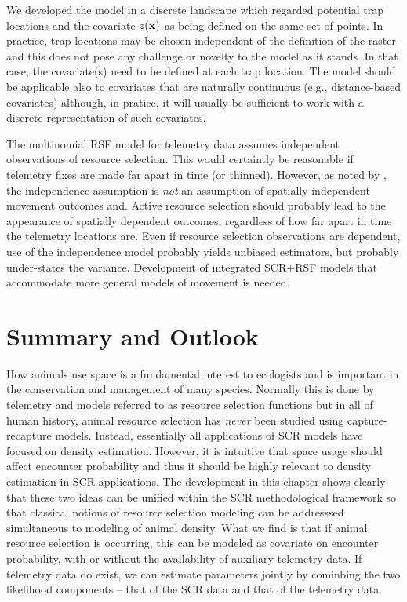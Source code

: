 We developed the model in a discrete landscape which regarded
potential trap
locations and the covariate $z({\bf x})$ as being defined on the same
set of points. In practice, trap locations may be chosen
independent of the definition of the raster and this does not pose any
challenge or novelty to the model as it stands. In that
case, the covariate(s) need to be defined at each trap location.
The model should be applicable also to covariates that are naturally
continuous (e.g., distance-based covariates) although, in pratice, it
will usually be sufficient to work with a discrete representation of
such covariates.

The multinomial RSF model for telemetry data assumes
independent observations of resource selection.  This would certaintly
be reasonable if telemetry fixes are made far apart in time (or thinned).
However, as noted by \citet{royle_etal:2012mee}, the independence assumption
is {\it not} an assumption of spatially independent movement outcomes
and.   %
Active resource selection should probably lead to the appearance of
spatially dependent outcomes,
 regardless of how far apart in time the telemetry
locations are.  Even if resource selection observations are dependent,
use of the independence model probably yields unbiased estimators, but
probably under-states the variance.
Development of integrated SCR+RSF models that
accommodate more general models of movement is needed.




\section{Summary and Outlook}


How animals use space is a fundamental interest to ecologists and is
important in the conservation and management of many species.
Normally this is done by telemetry and models referred to as resource
selection functions \citep{manly_etal:2002} but in all of human   %
history, animal resource selection has {\it never} been studied using
capture-recapture models. Instead, essentially all applications of SCR
models have focused on density estimation.  However, it is intuitive
that space usage should affect encounter probability and thus it
should be highly relevant to density estimation in SCR
applications. The development in this chapter shows clearly that these
two ideas can be unified within the SCR methodological framework so
that classical notions of resource selection modeling can be
addresssed simultaneous to modeling of animal density. What we find is
that if animal resource selection is occurring, this can be modeled as
covariate on encounter probability, with or without the availability
of auxiliary telemetry data. If telemetry data do exist, we can
estimate parameters jointly by cominbing the two likelihood components
-- that of the SCR data and that of the telemetry data.


